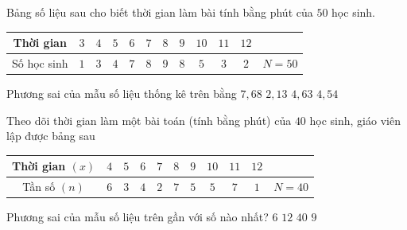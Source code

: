 \begin{ex}%
	Bảng số liệu sau cho biết thời gian làm bài  tính bằng phút của $50$ học sinh.
	\begin{longtable}{|c|c|c|c|c|c|c|c|c|c|c|c|}
		\hline 
		Thời  gian&$3$&$4$&$5$&$6$&$7$&$8$&$9$&$10$&$11$&$12$&\\
		\hline 
		Số học sinh&$1$&$3$&$4$&$7$&$8$&$9$&$8$&$5$&$3$&$2$&$N=50$\\ 
		 \hline
	\end{longtable}
	Phương sai của mẫu  số liệu thống kê trên bằng
	\choice 
		{$7{,}68$} 
		{$2{,}13$} 
		{$4{,}63$} 
		{\True $4{,}54$} 
\end{ex}

\begin{ex}%
	Theo dõi thời gian làm một bài toán (tính  bằng phút) của $40$ học sinh, giáo viên lập được bảng sau
	\begin{center}
		\begin{tabular}{|c|c|c|c|c|c|c|c|c|c|c|}
			\hline Thời gian $(x)$ & $4$ & $5$ & $6$ & $7$ & $8$ & $9$ & $10$ & $11$  & $12$ & \\
			\hline  Tần số $(n)$ & $6$ & $3$ & $4$ & $2$ & $7$ & $5$ & $5$ & $7$ & $1$ & $N=40$\\
			 \hline
		\end{tabular}
	\end{center}
	Phương sai của mẫu số liệu trên gần với số nào nhất? 
	\choice 
		 {\True $6$}
		 {$12$}
		 {$40$}
		{$9$} 
\end{ex}

